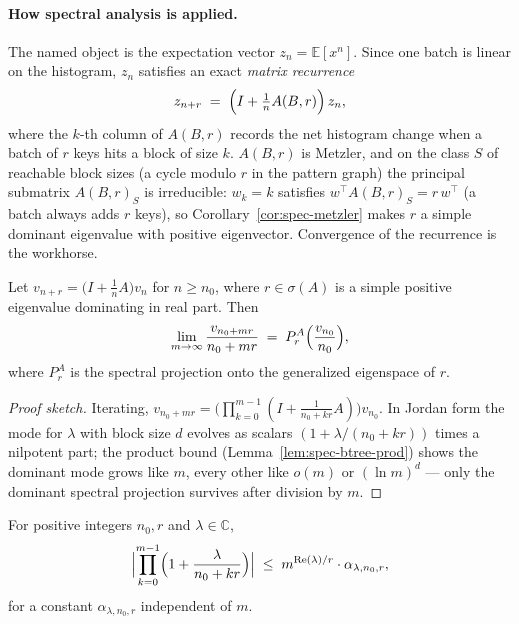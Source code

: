 \paragraph{How spectral analysis is applied.}
The named object is the expectation vector $z_n = \mathbb{E}[x^n]$. Since one
batch is linear on the histogram, $z_n$ satisfies an exact \emph{matrix
recurrence}
\[
z_{n+r} \;=\; \Bigl(I + \tfrac{1}{n} A(B,r)\Bigr)\, z_n,
\]
where the $k$-th column of $A(B,r)$ records the net histogram change when a
batch of $r$ keys hits a block of size $k$. $A(B,r)$ is Metzler, and on the
class $S$ of reachable block sizes (a cycle modulo $r$ in the pattern graph)
the principal submatrix $A(B,r)_S$ is irreducible: $w_k = k$ satisfies
$w^{\top}A(B,r)_S = r\,w^{\top}$ (a batch always adds $r$ keys), so
Corollary~\ref{cor:spec-metzler} makes $r$ a simple dominant eigenvalue
with positive eigenvector. Convergence of the recurrence is the workhorse.

\begin{theorem}\label{thm:spec-btree-recurrence}
Let $v_{n+r} = \bigl(I + \tfrac{1}{n}A\bigr) v_n$ for $n \ge n_0$, where $r \in
\sigma(A)$ is a simple positive eigenvalue dominating in real part. Then
\[
\lim_{m \to \infty} \frac{v_{n_0 + mr}}{n_0 + mr}
\;=\; P_r^A\Bigl(\frac{v_{n_0}}{n_0}\Bigr),
\]
where $P_r^A$ is the spectral projection onto the generalized eigenspace of
$r$. \eop
\end{theorem}

\begin{proof}[Proof sketch]
Iterating, $v_{n_0+mr} = \bigl(\prod_{k=0}^{m-1} (I +
\frac{1}{n_0+kr}A)\bigr) v_{n_0}$. In Jordan form the mode for $\lambda$
with block size $d$ evolves as scalars $(1 + \lambda/(n_0+kr))$ times a
nilpotent part; the product bound (Lemma~\ref{lem:spec-btree-prod}) shows
the dominant mode grows like $m$, every other like $o(m)$ or $(\ln m)^d$ ---
only the dominant spectral projection survives after division by $m$.
\end{proof}

\begin{lemma}\label{lem:spec-btree-prod}
For positive integers $n_0, r$ and $\lambda \in \mathbb{C}$,
\[
\Bigl|\prod_{k=0}^{m-1} \Bigl(1 + \frac{\lambda}{n_0 + kr}\Bigr)\Bigr|
\;\le\; m^{\operatorname{Re}(\lambda)/r}\cdot \alpha_{\lambda, n_0, r},
\]
for a constant $\alpha_{\lambda,n_0,r}$ independent of $m$. \eop
\end{lemma}

